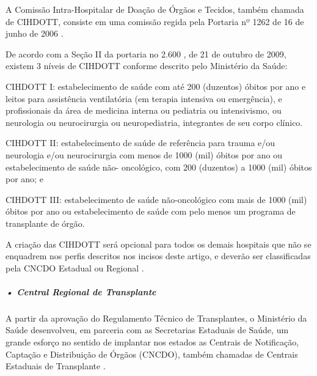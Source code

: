 \documentclass[portuguese,oneside]{tcc}
\begin{document}
A Comissão Intra-Hospitalar de Doação de Órgãos e Tecidos, também chamada de CIHDOTT, consiste em uma comissão regida pela Portaria nº 1262 de 16 de junho de 2006 \cite{HCI}.

De acordo com a Seção II da portaria no 2.600 \cite{PORTARIA}, de 21 de outubro de 2009, existem 3 níveis de CIHDOTT conforme descrito pelo Ministério da Saúde:

CIHDOTT I: estabelecimento de saúde com até 200 (duzentos) óbitos por ano e leitos para assistência ventilatória (em terapia intensiva ou emergência), e profissionais da área de medicina interna ou pediatria ou intensivismo, ou neurologia ou neurocirurgia ou neuropediatria, integrantes de seu corpo clínico.

CIHDOTT II: estabelecimento de saúde de referência para trauma e/ou neurologia e/ou neurocirurgia com menos de 1000 (mil) óbitos por ano ou estabelecimento de saúde não-
oncológico, com 200 (duzentos) a 1000 (mil) óbitos por ano; e

CIHDOTT III: estabelecimento de saúde não-oncológico com mais de 1000 (mil) óbitos por ano ou estabelecimento de saúde com pelo menos um programa de transplante de órgão.

A criação das CIHDOTT será opcional para todos os demais hospitais que não se enquadrem nos perfis descritos nos incisos deste artigo, e deverão ser classificadas pela CNCDO Estadual ou Regional \cite{BVSMS}.


\subparagraph{• Central Regional de Transplante}
A partir da aprovação do Regulamento Técnico de Transplantes, o Ministério da Saúde desenvolveu, em parceria com as Secretarias Estaduais de Saúde, um grande esforço no sentido de implantar nos estados as Centrais de Notificação, Captação e Distribuição de Órgãos (CNCDO), também chamadas de Centrais Estaduais de Transplante \cite{SEST}. 
\end{document}
